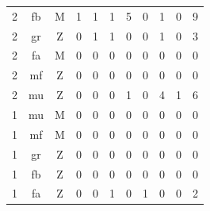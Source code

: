 \documentclass[thesis=M,czech]{FITthesis}[2013/05/10]
\begin{document}
\begin{table}[h]
\begin{tabular}{ccc | ccccccc | c}
    2          & fb        & M       & 1   & 1   & 1   & 5   & 0   & 1   & 0   & 9   \\
    2          & gr        & Z       & 0   & 1   & 1   & 0   & 0   & 1   & 0   & 3   \\
    2          & fa        & M       & 0   & 0   & 0   & 0   & 0   & 0   & 0   & 0   \\
    2          & mf        & Z       & 0   & 0   & 0   & 0   & 0   & 0   & 0   & 0   \\
    2          & mu        & Z       & 0   & 0   & 0   & 1   & 0   & 4   & 1   & 6   \\
    1          & mu        & M       & 0   & 0   & 0   & 0   & 0   & 0   & 0   & 0   \\
    1          & mf        & M       & 0   & 0   & 0   & 0   & 0   & 0   & 0   & 0   \\
    1          & gr        & Z       & 0   & 0   & 0   & 0   & 0   & 0   & 0   & 0   \\
    1          & fb        & Z       & 0   & 0   & 0   & 0   & 0   & 0   & 0   & 0   \\
    1          & fa        & Z       & 0   & 0   & 1   & 0   & 1   & 0   & 0   & 2   \\
    \end{tabular}
\end{table}
\end{document}
